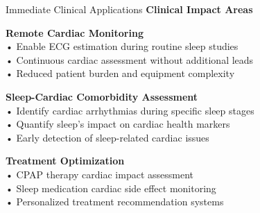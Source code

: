 \documentclass[aspectratio=169,11pt]{beamer}
\begin{document}
\begin{frame}{Immediate Clinical Applications}
  \textbf{\textcolor{tcairemblue}{\Large Clinical Impact Areas}}
  
  \vspace{1em}
      \colorbox{tcairemgreen!15}{\parbox{0.95\textwidth}{
    \large
        \textcolor{tcairemgreen}{\textbf{Remote Cardiac Monitoring}}\\
    \vspace{0.5em}
    \normalsize
        • Enable ECG estimation during routine sleep studies\\
    \vspace{0.2em}
        • Continuous cardiac assessment without additional leads\\
    \vspace{0.2em}
        • Reduced patient burden and equipment complexity
      }}
      
  \vspace{0.8em}
      \colorbox{tcairemorange!15}{\parbox{0.95\textwidth}{
    \large
        \textcolor{tcairemorange}{\textbf{Sleep-Cardiac Comorbidity Assessment}}\\
    \vspace{0.5em}
    \normalsize
        • Identify cardiac arrhythmias during specific sleep stages\\
    \vspace{0.2em}
        • Quantify sleep's impact on cardiac health markers\\
    \vspace{0.2em}
        • Early detection of sleep-related cardiac issues
      }}
      
  \vspace{0.8em}
      \colorbox{tcairemred!15}{\parbox{0.95\textwidth}{
    \large
        \textcolor{tcairemred}{\textbf{Treatment Optimization}}\\
    \vspace{0.5em}
    \normalsize
        • CPAP therapy cardiac impact assessment\\
    \vspace{0.2em}
        • Sleep medication cardiac side effect monitoring\\
    \vspace{0.2em}
        • Personalized treatment recommendation systems
      }}
\end{frame}
\end{document}
